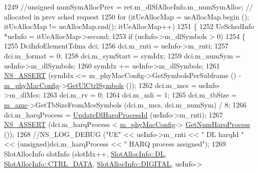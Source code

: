 \begin{DoxyCode}
1249         \textcolor{comment}{//unsigned numSymAllocPrev = ret.m\_dlSfAllocInfo.m\_numSymAlloc; // allocated in prev sched request}
1250         \textcolor{keywordflow}{for} (itUeAllocMap = ueAllocMap.begin (); itUeAllocMap != ueAllocMap.end(); itUeAllocMap++)
1251         \{
1252                 UeSchedInfo *ueInfo = itUeAllocMap->second;
1253                 \textcolor{keywordflow}{if} (ueInfo->m\_dlSymbols > 0)
1254                 \{
1255                         DciInfoElementTdma dci;
1256                         dci.m\_rnti = ueInfo->m\_rnti;
1257                         dci.m\_format = 0;
1258                         dci.m\_symStart = symIdx;
1259                         dci.m\_numSym = ueInfo->m\_dlSymbols;
1260                         symIdx += ueInfo->m\_dlSymbols;
1261                         \hyperlink{assert_8h_a6dccdb0de9b252f60088ce281c49d052}{NS\_ASSERT} (symIdx <= m\_phyMacConfig->GetSymbolsPerSubframe () - 
      \hyperlink{classns3_1_1MmWaveMacScheduler_a24d7af4971d2e500fe543cefbafa2fd9}{m\_phyMacConfig}->\hyperlink{classns3_1_1MmWavePhyMacCommon_aa0bf8af14050bc5dc6513fbc86319a9b}{GetUlCtrlSymbols} ());
1262                         dci.m\_mcs = ueInfo->m\_dlMcs;
1263                         dci.m\_rv = 0;
1264                         dci.m\_ndi = 1;
1265                         dci.m\_tbSize = \hyperlink{classns3_1_1MmWaveFlexTtiPfMacScheduler_ab9cf29146f4e3094526de08ffe08b193}{m\_amc}->GetTbSizeFromMcsSymbols (dci.m\_mcs, dci.m\_numSym) / 8;
1266                         dci.m\_harqProcess = \hyperlink{classns3_1_1MmWaveFlexTtiPfMacScheduler_af0662c31763e696fe9a2c84b48420a04}{UpdateDlHarqProcessId} (ueInfo->m\_rnti);
1267                         \hyperlink{assert_8h_a6dccdb0de9b252f60088ce281c49d052}{NS\_ASSERT} (dci.m\_harqProcess < \hyperlink{classns3_1_1MmWaveMacScheduler_a24d7af4971d2e500fe543cefbafa2fd9}{m\_phyMacConfig}->
      \hyperlink{classns3_1_1MmWavePhyMacCommon_a40773d84172ebeb5aff125f56ebcc5ac}{GetNumHarqProcess} ());
1268                         \textcolor{comment}{//NS\_LOG\_DEBUG ("UE" << ueInfo->m\_rnti << " DL harqId " <<
       (unsigned)dci.m\_harqProcess << " HARQ process assigned");}
1269                         SlotAllocInfo slotInfo (slotIdx++, \hyperlink{structns3_1_1SlotAllocInfo_a6cad60db1d39034f1851e2cea625fe5da9a365c9c56b7c32dcae38ee1a468ce6d}{SlotAllocInfo::DL}, 
      \hyperlink{structns3_1_1SlotAllocInfo_a3ea7cb503bfd0c9a4df55a71b81b9331a1ea636c3f068558fabacbc39934309b8}{SlotAllocInfo::CTRL\_DATA}, \hyperlink{structns3_1_1SlotAllocInfo_adcbd067d82be6260b3399167d8f0b4eca47a67c342db658a08ded9ce4b49417ea}{SlotAllocInfo::DIGITAL}, ueInfo->

\end{DoxyCode}
